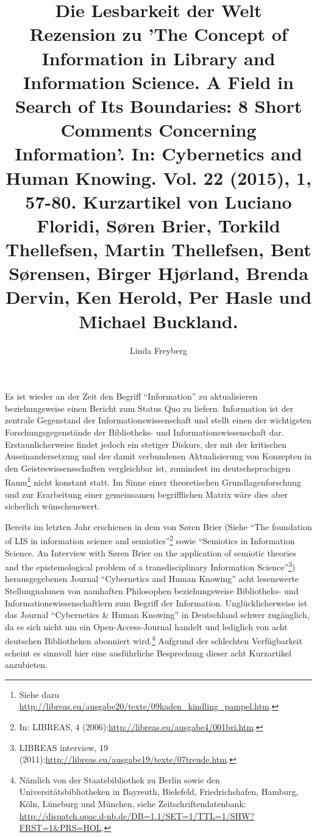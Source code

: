 \documentclass[a4paper,
fontsize=11pt,
oneside,
numbers=noperiodatend,
parskip=half-,
bibliography=totoc,
final
]{scrartcl}
\title{\LARGE{Die Lesbarkeit der Welt} \\ Rezension zu 'The Concept of Information in Library and Information Science. A Field in Search of Its Boundaries: 8 Short Comments Concerning Information'. In: Cybernetics and Human Knowing. Vol. 22 (2015), 1, 57-80. Kurzartikel von Luciano Floridi, Søren Brier, Torkild Thellefsen, Martin Thellefsen, Bent Sørensen, Birger Hjørland, Brenda Dervin, Ken Herold, Per Hasle und Michael Buckland.} %
\author{Linda Freyberg} %
\date{}
\begin{document}
\maketitle
\thispagestyle{fancyplain} 


Es ist wieder an der Zeit den Begriff \enquote{Information} zu
aktualisieren beziehungsweise einen Bericht zum Status Quo zu liefern.
Information ist der zentrale Gegenstand der Informationswissenschaft und
stellt einen der wichtigsten Forschungsgegenstände der Bibliotheks- und
Informationswissenschaft dar. Erstaunlicherweise findet jedoch ein
stetiger Diskurs, der mit der kritischen Auseinandersetzung und der
damit verbundenen Aktualisierung von Konzepten in den
Geisteswissensschaften vergleichbar ist, zumindest im deutschsprachigen
Raum\footnote{Siehe dazu
  \url{http://libreas.eu/ausgabe20/texte/09kaden_kindling_pampel.htm}.}
nicht konstant statt. Im Sinne einer theoretischen Grundlagenforschung
und zur Erarbeitung einer gemeinsamen begrifflichen Matrix wäre dies
aber sicherlich wünschenswert.

Bereits im letzten Jahr erschienen in dem von Søren Brier (Siehe
\enquote{The foundation of LIS in information science and
semiotics}\footnote{In: LIBREAS, 4
  (2006):\url{http://libreas.eu/ausgabe4/001bri.htm}.} sowie
\enquote{Semiotics in Information Science. An Interview with Søren Brier
on the application of semiotic theories and the epistemological problem
of a transdisciplinary Information Science}\footnote{LIBREAS interview,
  19 (2011):\url{http://libreas.eu/ausgabe19/texte/07treude.htm}.})
herausgegebenen Journal \enquote{Cybernetics and Human Knowing} acht
lesenswerte Stellungnahmen von namhaften Philosophen beziehungsweise
Bibliotheks- und Informationswissenschaftlern zum Begriff der
Information. Unglücklicherweise ist das Journal \enquote{Cybernetics \&
Human Knowing} in Deutschland schwer zugänglich, da es sich nicht um ein
Open-Access-Journal handelt und lediglich von acht deutschen
Bibliotheken abonniert wird.\footnote{Nämlich von der Staatsbibliothek
  zu Berlin sowie den Universitätsbibliotheken in Bayreuth, Bielefeld,
  Friedrichshafen, Hamburg, Köln, Lüneburg und München, siehe
  Zeitschriftendatenbank:
  \url{http://dispatch.opac.d-nb.de/DB=1.1/SET=1/TTL=1/SHW?FRST=1\&PRS=HOL}.}
Aufgrund der schlechten Verfügbarkeit scheint es sinnvoll hier eine
ausführliche Besprechung dieser acht Kurzartikel anzubieten.
\end{document}

